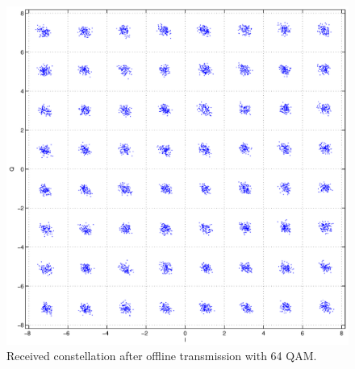 \documentclass[12pt,a4paper,openright]{report}
\begin{document}
\begin{figure}[H]
  \centering
    \includegraphics[width=1.0\textwidth]{64QAMscatter.eps}
    \caption[64-QAM constellation]{Received constellation after offline transmission with 64 QAM.}
    \label{fig:64qam_constellation}
\end{figure}
\end{document}
